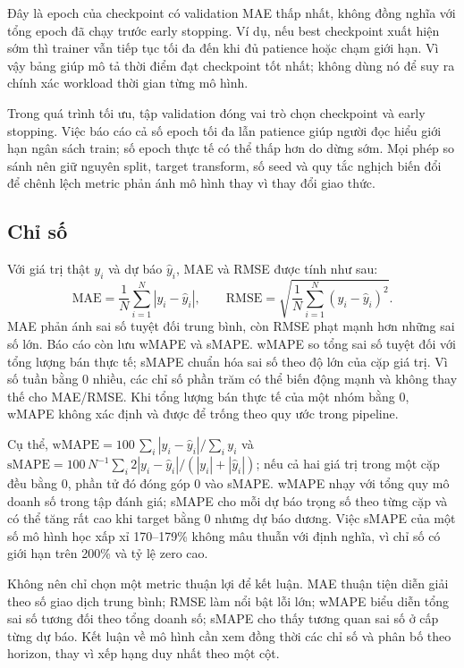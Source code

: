 \documentclass[12pt,a4paper,oneside]{article}
\begin{document}
Đây là epoch của checkpoint có validation MAE thấp nhất, không đồng nghĩa với tổng epoch đã chạy trước early stopping. Ví dụ, nếu best checkpoint xuất hiện sớm thì trainer vẫn tiếp tục tối đa đến khi đủ patience hoặc chạm giới hạn. Vì vậy bảng giúp mô tả thời điểm đạt checkpoint tốt nhất; không dùng nó để suy ra chính xác workload thời gian từng mô hình.

Trong quá trình tối ưu, tập validation đóng vai trò chọn checkpoint và early stopping. Việc báo cáo cả số epoch tối đa lẫn patience giúp người đọc hiểu giới hạn ngân sách train; số epoch thực tế có thể thấp hơn do dừng sớm. Mọi phép so sánh nên giữ nguyên split, target transform, số seed và quy tắc nghịch biến đổi để chênh lệch metric phản ánh mô hình thay vì thay đổi giao thức.

\subsection{Chỉ số}
Với giá trị thật $y_i$ và dự báo $\hat{y}_i$, MAE và RMSE được tính như sau:
\begin{equation}
\mathrm{MAE}=\frac{1}{N}\sum_{i=1}^{N}|y_i-\hat{y}_i|,\qquad
\mathrm{RMSE}=\sqrt{\frac{1}{N}\sum_{i=1}^{N}(y_i-\hat{y}_i)^2}.
\end{equation}
MAE phản ánh sai số tuyệt đối trung bình, còn RMSE phạt mạnh hơn những sai số lớn. Báo cáo còn lưu wMAPE và sMAPE. wMAPE so tổng sai số tuyệt đối với tổng lượng bán thực tế; sMAPE chuẩn hóa sai số theo độ lớn của cặp giá trị. Vì số tuần bằng 0 nhiều, các chỉ số phần trăm có thể biến động mạnh và không thay thế cho MAE/RMSE. Khi tổng lượng bán thực tế của một nhóm bằng 0, wMAPE không xác định và được để trống theo quy ước trong pipeline.

Cụ thể, $\mathrm{wMAPE}=100\,\sum_i|y_i-\hat y_i|/\sum_i y_i$ và
$\mathrm{sMAPE}=100\,N^{-1}\sum_i 2|y_i-\hat y_i|/(|y_i|+|\hat y_i|)$; nếu cả hai giá trị trong một cặp đều bằng 0, phần tử đó đóng góp 0 vào sMAPE. wMAPE nhạy với tổng quy mô doanh số trong tập đánh giá; sMAPE cho mỗi dự báo trọng số theo từng cặp và có thể tăng rất cao khi target bằng 0 nhưng dự báo dương. Việc sMAPE của một số mô hình học xấp xỉ 170--179\% không mâu thuẫn với định nghĩa, vì chỉ số có giới hạn trên 200\% và tỷ lệ zero cao.

Không nên chỉ chọn một metric thuận lợi để kết luận. MAE thuận tiện diễn giải theo số giao dịch trung bình; RMSE làm nổi bật lỗi lớn; wMAPE biểu diễn tổng sai số tương đối theo tổng doanh số; sMAPE cho thấy tương quan sai số ở cấp từng dự báo. Kết luận về mô hình cần xem đồng thời các chỉ số và phân bố theo horizon, thay vì xếp hạng duy nhất theo một cột.
\end{document}
